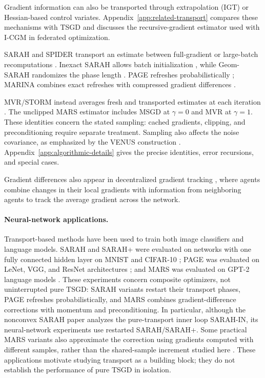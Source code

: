 Gradient information can also be transported through extrapolation
(IGT) or Hessian-based control variates. Appendix~\ref{app:related-transport}
compares these mechanisms with TSGD and discusses the recursive-gradient
estimator used with I-CGM in federated optimization.

SARAH and SPIDER transport an estimate between full-gradient or
large-batch recomputations
\citep{nguyen2017sarah,nguyen2017sarah_nonconvex,fang2018spider}.
Inexact SARAH allows batch initialization \citep{nguyen2021inexact},
while Geom-SARAH randomizes the phase length
\citep{horvath2022adaptivity}. PAGE refreshes probabilistically
\citep{li2021page}; MARINA combines exact refreshes with compressed
gradient differences \citep{gorbunov2021marina}.

MVR/STORM instead averages fresh and transported estimates at each
iteration \citep{cutkosky2019momentum}. The unclipped MARS estimator
\citep{yuan2025mars} includes MSGD at $\gamma=0$ and MVR at $\gamma=1$.
These identities concern the stated sampling: cached gradients,
clipping, and preconditioning require separate treatment. Sampling
also affects the noise covariance, as emphasized by the VENUS
construction \citep{venus2026draft}.
Appendix~\ref{app:algorithmic-details} gives the precise identities,
error recursions, and special cases.

Gradient differences also appear in decentralized gradient tracking
\citep{Qu_2018}, where agents combine changes in their local gradients
with information from neighboring agents to track the average gradient
across the network.

\paragraph{Neural-network applications.}
Transport-based methods have been used to train both image classifiers
and language models. SARAH and SARAH+ were evaluated on networks with
one fully connected hidden layer on MNIST and CIFAR-10
\citep{nguyen2017sarah_nonconvex}; PAGE was evaluated on LeNet, VGG,
and ResNet architectures \citep{li2021page}; and MARS was evaluated
on GPT-2 language models \citep{yuan2025mars}.
These experiments concern composite optimizers, not uninterrupted
pure TSGD: SARAH variants restart their transport phases, PAGE refreshes
probabilistically, and MARS combines gradient-difference corrections
with momentum and preconditioning. In particular, although the
nonconvex SARAH paper analyzes the pure-transport inner loop SARAH-IN,
its neural-network experiments use restarted SARAH/SARAH+.
Some practical MARS variants also approximate the correction using
gradients computed with different samples, rather than the shared-sample
increment studied here \citep{yuan2025mars}.
These applications motivate studying transport as a building block;
they do not establish the performance of pure TSGD in isolation.


